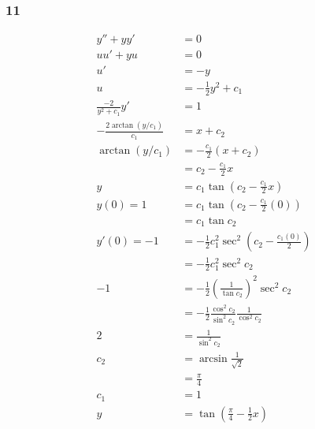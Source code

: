 \documentclass{article}
\begin{document}
\subsubsection{11}

\begin{align*}
  y'' + yy'                        & = 0                                                                \\
  uu' + yu                         & = 0                                                                \\
  u'                               & = -y                                                               \\
  u                                & = -\frac{1}{2} y^2 + c_1                                           \\
  \frac{-2}{y^2 + c_1} y'          & = 1                                                                \\
  -\frac{2 \arctan (y / c_1)}{c_1} & = x + c_2                                                          \\
  \arctan (y / c_1)                & = -\frac{c_1}{2} (x + c_2)                                         \\
                                   & = c_2 - \frac{c_1}{2} x                                            \\
  y                                & = c_1 \tan \left( c_2 - \frac{c_1}{2} x \right)                    \\
  y(0) = 1                         & = c_1 \tan \left( c_2 - \frac{c_1}{2} (0) \right)                  \\
                                   & = c_1 \tan c_2                                                     \\
  y'(0) = -1                       & = -\frac{1}{2} c_1^2 \sec^2 \left( c_2 - \frac{c_1 (0)}{2} \right) \\
                                   & = -\frac{1}{2} c_1^2 \sec^2 c_2                                    \\
  -1                               & = -\frac{1}{2} \left( \frac{1}{\tan c_2} \right)^2 \sec^2 c_2      \\
                                   & = -\frac{1}{2} \frac{\cos^2 c_2}{\sin^2 c_2} \frac{1}{\cos^2 c_2}  \\
  2                                & = \frac{1}{\sin^2 c_2}                                             \\
  c_2                              & = \arcsin \frac{1}{\sqrt{2}}                                       \\
                                   & = \frac{\pi}{4}                                                    \\
  c_1                              & = 1                                                                \\
  y                                & = \tan \left( \frac{\pi}{4} - \frac{1}{2} x \right)
\end{align*}
\end{document}
